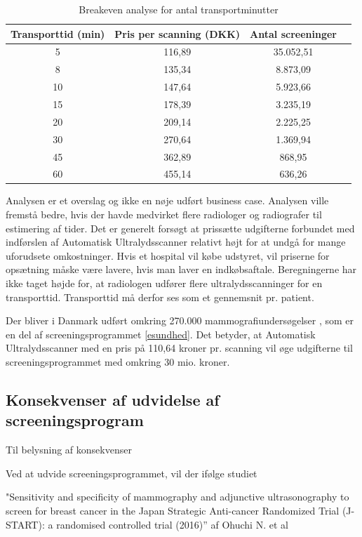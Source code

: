 \begin{table}[htb]
\centering
\begin{tabular}{ | c | c | c | p{} | }
\hline
\textbf{Transporttid (min)} & \textbf{Pris per scanning (DKK)} & \textbf{Antal screeninger} \\\hline
5 & 116,89 & 35.052,51 \\\hline
8 & 135,34 & 8.873,09\\\hline
10 & 147,64 & 5.923,66\\\hline
15 & 178,39 & 3.235,19 \\\hline
20 & 209,14 & 2.225,25\\\hline
30 & 270,64 & 1.369,94\\\hline
45 & 362,89 & 868,95 \\\hline
60 & 455,14 & 636,26 \\\hline
\end{tabular}
\caption{Breakeven analyse for antal transportminutter}
\label{Breakeven}
\end{table}

Analysen er et overslag og ikke en nøje udført business case. Analysen ville fremstå bedre, hvis der havde medvirket flere radiologer og radiografer til estimering af tider. Det er generelt forsøgt at prissætte udgifterne forbundet med indførslen af Automatisk Ultralydsscanner relativt højt for at undgå for mange uforudsete omkostninger. Hvis et hospital vil købe udstyret, vil priserne for opsætning måske være lavere, hvis man laver en indkøbsaftale. Beregningerne har ikke taget højde for, at radiologen udfører flere ultralydsscanninger for en transporttid. Transporttid må derfor ses som et gennemsnit pr. patient. 

Der bliver i Danmark udført omkring 270.000 mammografiundersøgelser , som er en del af screeningsprogrammet \ref{esundhed}. Det betyder, at Automatisk Ultralydsscanner med en pris på 110,64 kroner pr. scanning vil øge udgifterne til screeningsprogrammet med omkring 30 mio. kroner. 

\subsection{Konsekvenser af udvidelse af screeningsprogram} 
Til belysning af konsekvenser

Ved at udvide screeningsprogrammet, vil der ifølge studiet 

"Sensitivity and specificity of mammography and adjunctive ultrasonography to screen for breast cancer in the Japan Strategic Anti-cancer Randomized Trial (J-START): a randomised controlled trial (2016)” af Ohuchi N. et al 

